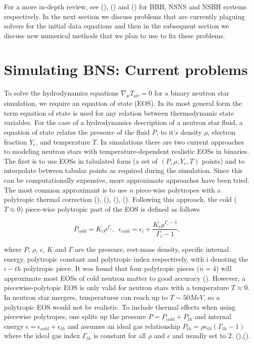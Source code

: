 For a more in-depth review, see (\cite{sperhake2014numerical}), (\cite{faber2012binary}) and (\cite{shibata2011coalescence}) for BBH, NSNS and NSBH systems respectively. In the next section we discuss problems that are currently plaguing solvers for the initial data equations and then in the subsequent section we discuss new numerical methods that we plan to use to fix these problems.

\section{Simulating BNS: Current problems}

To solve the hydrodynamics equations $\nabla_\mu T_{\mu\nu} = 0$ for a binary neutron star simulation, we require an equation of state (EOS). In its most general form the term equation of state is used for any relation between thermodynamic state variables. For the case of a hydrodynamics description of a neutron star fluid, a equation of state relates the pressure of the fluid $P$, to it's density $\rho$, electron fraction $Y_e$, and temperature $T$. In simulations there are two current approaches to modeling neutron stars with temperature-dependent realistic EOSs in binaries. The first is to use EOSs in tabulated form (a set of $(P,\rho,Y_e,T)$ points) and to interpolate between tabular points as required during the simulation. Since this can be computationally expensive, more approximate approaches have been tried. The most common approximant is to use $n$ piece-wise polytropes with a polytropic thermal correction (\cite{deaton2013black}), (\cite{kyutoku2013black}), (\cite{bauswein2014revealing}), (\cite{kyutoku2015dynamical}). Following this approach, the cold ($T \approx 0$) piece-wise polytropic part of the EOS is defined as follows

\begin{equation}
\label{eq:7}
P_{cold} = K_i\rho^{\Gamma_i},\,\,\, \epsilon_{cold} = \epsilon_i + \frac{K_{i}\rho^{\Gamma_{i}-1}}{\Gamma_{i}-1},
\end{equation}

where $P$, $\rho$, $\epsilon$, $K$ and $\Gamma$ are the pressure, rest-mass density, specific internal energy, polytropic constant and polytropic index respectively, with i denoting the $i-th$ polytropic piece. It was found that four polytropic pieces ($n=4$) will approximate most EOSs of cold neutron matter to good accuracy (\cite{read2008neutron}). However, a piecewise-polytopic EOS is only valid for neutron stars with a temperature $T \approx 0$. In neutron star mergers, temperatures can reach up to $T \sim 50 MeV$, so a polytropic EOS would not be realistic. To include thermal effects when using piecewise polytropes, one splits up the pressure $P = P_{cold} + P_{th}$ and internal energy $\epsilon = \epsilon_{cold}+\epsilon_{th}$ and assumes an ideal gas relationship $P_{th} = \rho \epsilon_{th}(\Gamma_{th}-1)$ where the ideal gas index $\Gamma_{th}$ is constant for all $\rho$ and $\epsilon$ and usually set to 2. (\cite{bauswein2010testing}),(\cite{takami2014constraining}).

